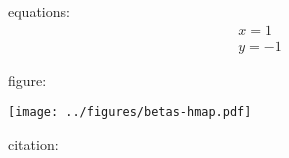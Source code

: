 \documentclass{article}
\begin{document}
equations:
\begin{gather}
	x = 1 \\
	y = -1
\end{gather}

figure:

\texttt{[image: ../figures/betas-hmap.pdf]}

citation:
\cite{Cieslak2019}

\printbibliography
\end{document}
